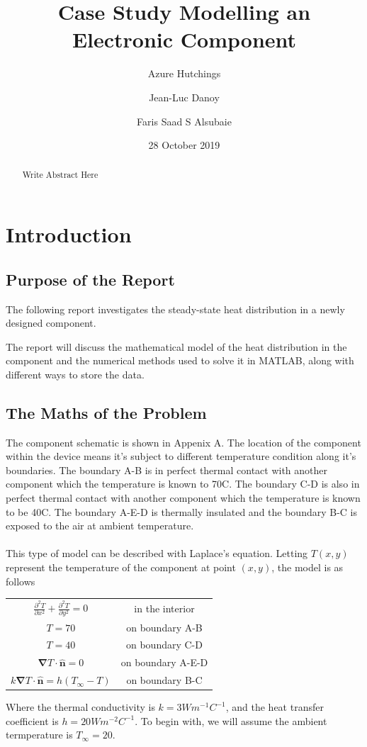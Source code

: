 \documentclass[12pt,a4paper]{article}
\title{Case Study Modelling an Electronic Component}
\author{
  Azure Hutchings
  \and
  Jean-Luc Danoy
  \and
  Faris Saad S Alsubaie
}
\date{28 October 2019}
\begin{document}
 
\begin{titlepage}
\maketitle
\end{titlepage}

\renewcommand{\abstractname}{Executive Summary}
\begin{abstract}
Write Abstract Here
\end{abstract}

\pagebreak

\tableofcontents

\pagebreak

\section{Introduction}

\subsection{Purpose of the Report}
The following report investigates the steady-state heat distribution in a newly designed component. 

The report will discuss the mathematical model of the heat distribution in the component and the numerical methods used to solve it in MATLAB, along with different ways to store the data.

\subsection{The Maths of the Problem}
The component schematic is shown in Appenix A. The location of the component within the device means it's subject to different temperature condition along it's boundaries. The boundary A-B is in perfect thermal contact with another component which the temperature is known to 70\degree C. The boundary C-D is also in perfect thermal contact with another component which the temperature is known to be 40\degree C. The boundary A-E-D is thermally insulated and the boundary B-C is exposed to the air at ambient temperature.
\\\\
This type of model can be described with Laplace's equation. Letting $T(x,y)$ represent the temperature of the component at point $(x, y)$, the model is as follows	

\begin{center}
\begin{tabular}{c c}
$\frac{\partial^2 T}{\partial x^2}+\frac{\partial^2 T}{\partial y^2}=0$ & in the interior\\
$T = 70$ & on boundary A-B \\
$T = 40$ & on boundary C-D \\
$\boldsymbol{\nabla} T \cdot {\hat{\textbf{n}}} = 0$ & on boundary A-E-D\\
$k\boldsymbol{\nabla}T\cdot\hat{\textbf{n}} = h(T_{\infty} - T)$ & on boundary B-C
\end{tabular}
\end{center}
Where the thermal conductivity is $k=3Wm^{-1}C^{-1}$, and the heat transfer coefficient is $h=20 Wm^{-2}C^{-1}$. To begin with, we will assume the ambient termperature is $T_\infty = 20$.
\end{document}
